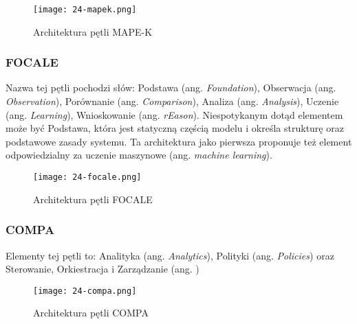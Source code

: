 \begin{figure}[!h]
    \centering \texttt{[image: 24-mapek.png]}
    \caption{Architektura pętli MAPE-K}\label{fig:24-mapek}
\end{figure}

\subsubsection{FOCALE}
Nazwa tej pętli pochodzi słów: Podstawa (ang. \textit{Foundation}), Obserwacja (ang. \textit{Observation}), Porównanie (ang. \textit{Comparison}), Analiza (ang. \textit{Analysis}), Uczenie (ang. \textit{Learning}), Wnioskowanie (ang. \textit{rEason}). Niespotykanym dotąd elementem może być Podstawa, która jest statyczną częścią modelu i określa strukturę oraz podstawowe zasady systemu. Ta architektura jako pierwsza proponuje też element odpowiedzialny za uczenie maszynowe (ang. \textit{machine learning}). 

\begin{figure}[!h]
    \centering \texttt{[image: 24-focale.png]}
    \caption{Architektura pętli FOCALE}\label{fig:24-focale}
\end{figure}

\subsubsection{COMPA}
Elementy tej pętli to: Analityka (ang. \textit{Analytics}), Polityki (ang. \textit{Policies}) oraz Sterowanie, Orkiestracja i Zarządzanie (ang. )

\begin{figure}[!h]
    \centering \texttt{[image: 24-compa.png]}
    \caption{Architektura pętli COMPA}\label{fig:24-compa}
\end{figure}
